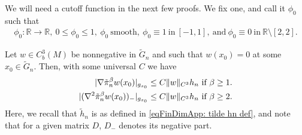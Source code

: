 \documentclass[11pt,reqno]{amsart}
\numberwithin{equation}{section}
\theoremstyle{plain}
\def\real{{\mathbb R}}
\begin{document}
We will need a cutoff function in the next few proofs.  We fix one, and call it $\phi_0$ such that
\begin{align}\label{eqWhitney:Phi0Cutoff}
	\phi_0:\real\to\real,\ 0\leq \phi_0\leq1,\ \phi_0\ \text{smooth},\ \phi_0\equiv 1\ \text{in}\ [-1,1],\ \text{and}\ \phi_0\equiv0\ \text{in}\ \real\setminus[2,2].
\end{align}
  
\begin{prop}\label{prop:local minima in Gn almost gives zero gradient nonnegative Hessian}
  Let $w\in C^3_b(M)$ be nonnegative in $\tilde G_n$ and such that $w(x_0)=0$ at some $x_0 \in \tilde G_n$. Then, with some universal $C$ we have
  \begin{align*}
    |\nabla \tilde \pi_n^\beta w(x_0)|_{g_{x_0}}\leq C\|w\|_{C^3}h_n \textnormal{ if } \beta\geq 1.\\
    |(\nabla^2 \tilde \pi_n^\beta w(x_0))_-|_{g_{x_0}} \leq C\|w\|_{C^3}h_n \textnormal{ if } \beta\geq 2.	
  \end{align*}	  
  Here, we recall that $\tilde h_n$ is as defined in \eqref{eqFinDimApp: tilde hn def}, and note that for a given matrix $D$, $D_-$ denotes its negative part.
\end{prop}
\end{document}

